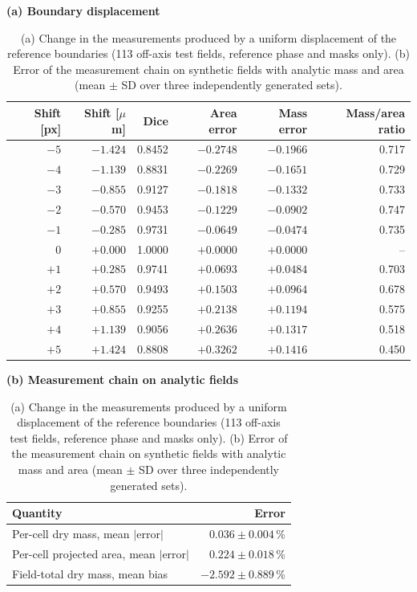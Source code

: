 \begin{table}[!htbp]
\centering
\caption{(a) Change in the measurements produced by a uniform displacement of
the reference boundaries (113 off-axis test fields, reference phase and masks
only). (b) Error of the measurement chain on synthetic fields with analytic
mass and area (mean $\pm$ SD over three independently generated sets).}
\label{tab:floors}
\footnotesize
\textbf{(a) Boundary displacement}\\[2pt]
\begin{tabular*}{\textwidth}{@{\extracolsep{\fill}}rrrrrr@{}}
\toprule
Shift [px] & Shift [$\mu$m] & Dice & Area error & Mass error & Mass/area ratio \\
\midrule
$-5$ & $-1.424$ & 0.8452 & $-0.2748$ & $-0.1966$ & 0.717 \\
$-4$ & $-1.139$ & 0.8831 & $-0.2269$ & $-0.1651$ & 0.729 \\
$-3$ & $-0.855$ & 0.9127 & $-0.1818$ & $-0.1332$ & 0.733 \\
$-2$ & $-0.570$ & 0.9453 & $-0.1229$ & $-0.0902$ & 0.747 \\
$-1$ & $-0.285$ & 0.9731 & $-0.0649$ & $-0.0474$ & 0.735 \\
$0$ & $+0.000$ & 1.0000 & $+0.0000$ & $+0.0000$ & -- \\
$+1$ & $+0.285$ & 0.9741 & $+0.0693$ & $+0.0484$ & 0.703 \\
$+2$ & $+0.570$ & 0.9493 & $+0.1503$ & $+0.0964$ & 0.678 \\
$+3$ & $+0.855$ & 0.9255 & $+0.2138$ & $+0.1194$ & 0.575 \\
$+4$ & $+1.139$ & 0.9056 & $+0.2636$ & $+0.1317$ & 0.518 \\
$+5$ & $+1.424$ & 0.8808 & $+0.3262$ & $+0.1416$ & 0.450 \\
\bottomrule
\end{tabular*}

\vspace{8pt}
\textbf{(b) Measurement chain on analytic fields}\\[2pt]
\begin{tabular*}{\textwidth}{@{\extracolsep{\fill}}lr@{}}
\toprule
Quantity & Error \\
\midrule
Per-cell dry mass, mean $|$error$|$       & $0.036 \pm 0.004$\,\% \\
Per-cell projected area, mean $|$error$|$ & $0.224 \pm 0.018$\,\% \\
Field-total dry mass, mean bias          & $-2.592 \pm 0.889$\,\% \\
\bottomrule
\end{tabular*}
\end{table}
